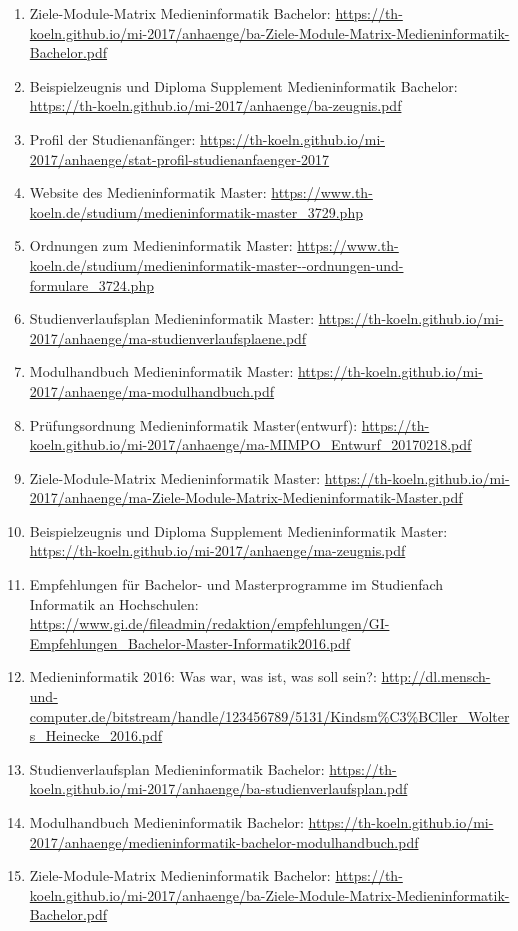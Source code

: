 \documentclass[BCOR12mm,DIV11,titlepage,a4paper,oneside,10pt]{scrbook}
\begin{document}
\begin{sloppypar}
\begin{flushleft}
\begin{enumerate}
\item{Ziele-Module-Matrix Medieninformatik Bachelor: \url{https://th-koeln.github.io/mi-2017/anhaenge/ba-Ziele-Module-Matrix-Medieninformatik-Bachelor.pdf} } 
\item{Beispielzeugnis und Diploma Supplement Medieninformatik Bachelor: \url{https://th-koeln.github.io/mi-2017/anhaenge/ba-zeugnis.pdf} } 
\item{Profil der Studienanfänger: \url{https://th-koeln.github.io/mi-2017/anhaenge/stat-profil-studienanfaenger-2017} } 
\item{Website des Medieninformatik Master: \url{https://www.th-koeln.de/studium/medieninformatik-master\_3729.php} } 
\item{Ordnungen zum Medieninformatik Master: \url{https://www.th-koeln.de/studium/medieninformatik-master--ordnungen-und-formulare\_3724.php} } 
\item{Studienverlaufsplan Medieninformatik Master: \url{https://th-koeln.github.io/mi-2017/anhaenge/ma-studienverlaufsplaene.pdf} } 
\item{Modulhandbuch Medieninformatik Master: \url{https://th-koeln.github.io/mi-2017/anhaenge/ma-modulhandbuch.pdf} } 
\item{Prüfungsordnung Medieninformatik Master(entwurf): \url{https://th-koeln.github.io/mi-2017/anhaenge/ma-MIMPO\_Entwurf\_20170218.pdf} } 
\item{Ziele-Module-Matrix Medieninformatik Master: \url{https://th-koeln.github.io/mi-2017/anhaenge/ma-Ziele-Module-Matrix-Medieninformatik-Master.pdf} } 
\item{Beispielzeugnis und Diploma Supplement Medieninformatik Master: \url{https://th-koeln.github.io/mi-2017/anhaenge/ma-zeugnis.pdf} } 
\item{Empfehlungen für Bachelor- und Masterprogramme im Studienfach Informatik an Hochschulen: \url{https://www.gi.de/fileadmin/redaktion/empfehlungen/GI-Empfehlungen\_Bachelor-Master-Informatik2016.pdf} } 
\item{Medieninformatik 2016: Was war, was ist, was soll sein?: \url{http://dl.mensch-und-computer.de/bitstream/handle/123456789/5131/Kindsm\%C3\%BCller\_Wolters\_Heinecke\_2016.pdf} } 
\item{Studienverlaufsplan Medieninformatik Bachelor: \url{https://th-koeln.github.io/mi-2017/anhaenge/ba-studienverlaufsplan.pdf} } 
\item{Modulhandbuch Medieninformatik Bachelor: \url{https://th-koeln.github.io/mi-2017/anhaenge/medieninformatik-bachelor-modulhandbuch.pdf} } 
\item{Ziele-Module-Matrix Medieninformatik Bachelor: \url{https://th-koeln.github.io/mi-2017/anhaenge/ba-Ziele-Module-Matrix-Medieninformatik-Bachelor.pdf} } 

\end{enumerate}
\end{flushleft}
\end{sloppypar}
\end{document}
